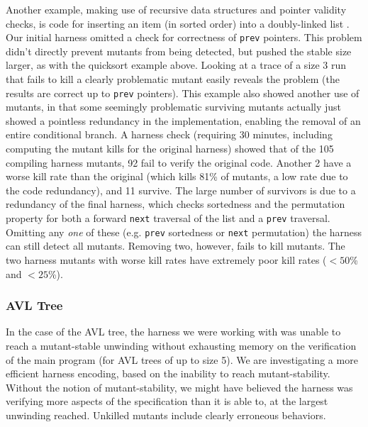 \documentclass{svjour3}
\begin{document}
Another example, making use of recursive data structures and pointer
validity checks, is code for inserting an item (in
sorted order) into a doubly-linked list \cite{DLLInsert}.  Our initial
harness omitted a check for correctness of {\tt prev} pointers.  This
problem didn't directly prevent mutants from being detected, but
pushed the stable size larger, as with the quicksort example above.
Looking at a trace of a size 3 run that fails to kill a clearly
problematic mutant easily reveals the problem (the results are correct
up to {\tt prev} pointers).  This example also showed another use of
mutants, in that some seemingly problematic surviving mutants actually
just showed a pointless redundancy in the implementation, enabling the
removal of an entire conditional branch.  A harness check (requiring
30 minutes, including computing the mutant kills for the original
harness) showed that of the 105 compiling harness mutants, 92 fail to
verify the original code.  Another 2 have a worse kill rate than the
original (which kills 81\% of mutants, a low rate due to the code
redundancy), and 11 survive.  The large number of survivors is due to
a redundancy of the final harness, which checks sortedness and the
permutation property for both a forward {\tt next} traversal of the
list and a {\tt prev} traversal.  Omitting any \emph{one} of these
(e.g. {\tt prev} sortedness or {\tt next} permutation) the harness can
still detect all mutants.  Removing two, however, fails to kill
mutants.  The two harness mutants with worse kill rates have extremely poor
kill rates ($<50$\% and $<25$\%).

\subsubsection{AVL Tree}

In the case of the AVL tree, the harness we were working with
was unable to reach a mutant-stable unwinding without exhausting
memory on the verification of the main program (for AVL trees of up to
size 5).  We are investigating a more efficient harness encoding,
based on the inability to reach mutant-stability.  Without the notion
of mutant-stability, we might have believed the harness was verifying
more aspects of the specification than it is able to, at the largest
unwinding reached.  Unkilled mutants include clearly erroneous behaviors.
\end{document}

